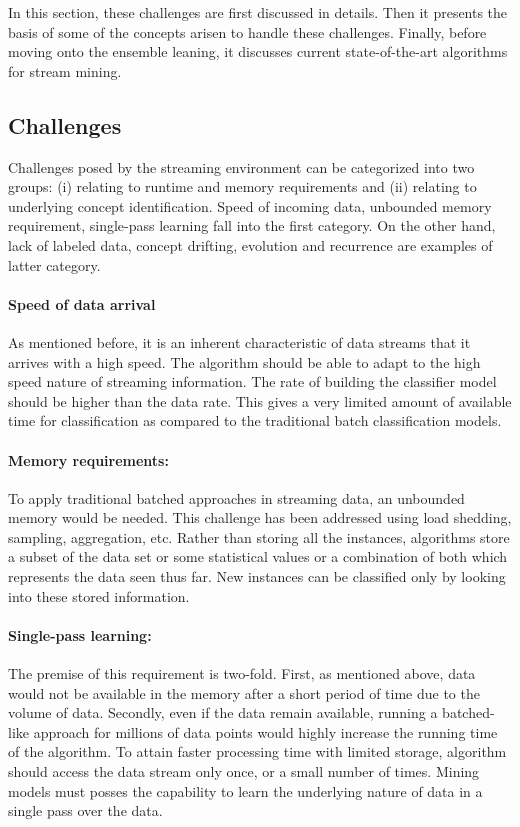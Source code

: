 \documentclass[a4paper, 11pt, oneside]{book}
\begin{document}
In this section, these challenges are first discussed in details. Then it presents the basis of some of the concepts arisen to handle these challenges. Finally, before moving onto the ensemble leaning, it discusses current state-of-the-art algorithms for stream mining.

\subsection{Challenges}
Challenges posed by the streaming environment can be categorized into two groups: (i) relating to runtime and memory requirements and (ii) relating to underlying concept identification. Speed of incoming data, unbounded memory requirement, single-pass learning fall into the first category. On the other hand, lack of labeled data, concept drifting, evolution and recurrence are examples of latter category.

\paragraph{Speed of data arrival}
As mentioned before, it is an inherent characteristic of data streams that it arrives with a high speed. The algorithm should be able to adapt to the high speed nature of streaming information. The rate of building the classifier model should be higher than the data rate. This gives a very limited amount of available time for classification as compared to the traditional batch classification models.

\paragraph{Memory requirements:}
To apply traditional batched approaches in streaming data, an unbounded memory would be needed. This challenge has been addressed using load shedding, sampling, aggregation, etc. Rather than storing all the instances, algorithms store a subset of the data set or some statistical values or a combination of both which represents the data seen thus far. New instances can be classified only by looking into these stored information. 

\paragraph{Single-pass learning:}
The premise of this requirement is two-fold. First, as mentioned above, data would not be available in the memory after a short period of time due to the volume of data. Secondly, even if the data remain available, running a batched-like approach for millions of data points would highly increase the running time of the algorithm. To attain faster processing time with limited storage, algorithm should access the data stream only once, or a small number of times. Mining models must posses the capability to learn the underlying nature of data in a single pass over the data.
\end{document}

